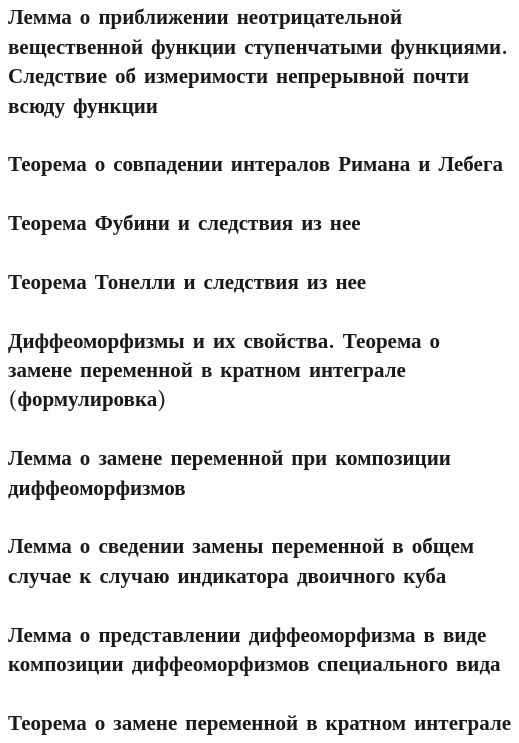 \documentclass[a4paper]{article}
\theoremstyle{definition}
\theoremstyle{remark}
\begin{document}
    \subsection{ Лемма о приближении неотрицательной вещественной функции ступенчатыми функциями. Следствие об измеримости непрерывной почти всюду функции}
    \subsection{ Теорема о совпадении интералов Римана и Лебега}
    \subsection{ Теорема Фубини и следствия из нее}
    \subsection{ Теорема Тонелли и следствия из нее}
    \subsection{ Диффеоморфизмы и их свойства. Теорема о замене переменной в кратном интеграле (формулировка)}
    \subsection{ Лемма о замене переменной при композиции диффеоморфизмов}
    \subsection{ Лемма о сведении замены переменной в общем случае к случаю индикатора двоичного куба}
    \subsection{ Лемма о представлении диффеоморфизма в виде композиции диффеоморфизмов специального вида}
    \subsection{ Теорема о замене переменной в кратном интеграле}
    
\end{document}
